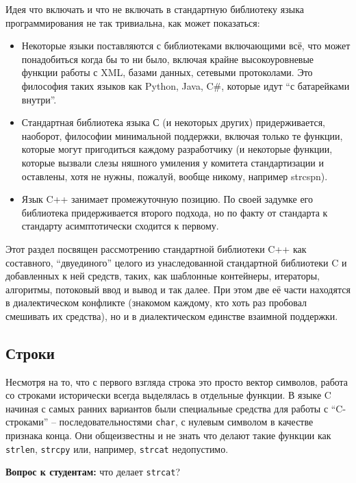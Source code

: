 \documentclass[a4paper,12pt,oneside]{article}
\newif\ifanswers
\begin{document}
Идея что включать и что не включать в стандартную библиотеку языка программирования не так тривиальна, как может показаться: 
\begin{itemize}
\item
Некоторые языки поставляются с библиотеками включающими всё, что может понадобиться когда бы то ни было, включая крайне высокоуровневые функции работы с XML, базами данных, сетевыми протоколами. Это философия таких языков как Python, Java, C\#, которые идут ``с батарейками внутри''.
\item
Стандартная библиотека языка С (и некоторых других) придерживается, наоборот, философии минимальной поддержки, включая только те функции, которые могут пригодиться каждому разработчику (и некоторые функции, которые вызвали слезы няшного умиления у комитета стандартизации и оставлены, хотя не нужны, пожалуй, вообще никому, например strcspn).
\item
Язык C++ занимает промежуточную позицию. По своей задумке его библиотека придерживается второго подхода, но по факту от стандарта к стандарту асимптотически сходится к первому.
\end{itemize}

Этот раздел посвящен рассмотрению стандартной библиотеки C++ как составного, ``двуединого'' целого из унаследованной стандартной библиотеки C и добавленных к ней средств, таких, как шаблонные контейнеры, итераторы, алгоритмы, потоковый ввод и вывод и так далее. При этом две её части находятся в диалектическом конфликте (знакомом каждому, кто хоть раз пробовал смешивать их средства), но и в диалектическом единстве взаимной поддержки.

\subsection{Строки}

Несмотря на то, что с первого взгляда строка это просто вектор символов, работа со строками исторически всегда выделялась в отдельные функции. В языке C начиная с самых ранних вариантов были специальные средства для работы с ``C-строками'' -- последовательностями \lstinline!char!, с нулевым символом в качестве признака конца. Они общеизвестны и не знать что делают такие функции как \lstinline!strlen!, \lstinline!strcpy! или, например, \lstinline!strcat! недопустимо.

\textbf{Вопрос к студентам:} что делает \lstinline!strcat!?

\ifanswers
Правильный ответ: дописывает в конец строки, на начало которой указывает первый аргумент, строку, на начало которой указывает второй аргумент. При этом первый символ второй строки замещает завершающий нулевой символ первой
\fi
\end{document}
